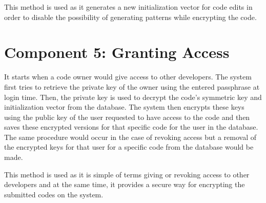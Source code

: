 This method is used as it generates a new initialization vector for code edits in order to disable the possibility of generating patterns while encrypting the code.

\section{Component 5: Granting Access}

It starts when a code owner would give access to other developers. The system first tries to retrieve the private key of the owner using the entered passphrase at login time. Then, the private key is used to decrypt the code's symmetric key and initialization vector from the database. The system then encrypts these keys using the public key of the user requested to have access to the code and then saves these encrypted versions for that specific code for the user in the database. The same procedure would occur in the case of revoking access but a removal of the encrypted keys for that user for a specific code from the database would be made.

This method is used as it is simple of terms giving or revoking access to other developers and at the same time, it provides a secure way for encrypting the submitted codes on the system.